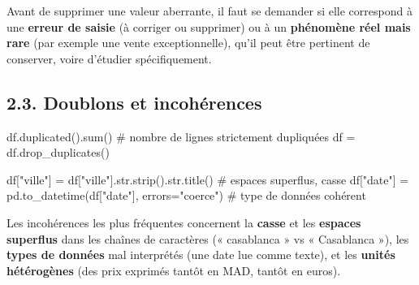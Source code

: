 \documentclass[
  french,
  letterpaper,
  open=any]{scrbook}
\newenvironment{Shaded}{\begin{snugshade}}{\end{snugshade}}
\newcommand{\BuiltInTok}[1]{\textcolor[rgb]{0.00,0.23,0.31}{#1}}
\newcommand{\CommentTok}[1]{\textcolor[rgb]{0.37,0.37,0.37}{#1}}
\newcommand{\NormalTok}[1]{\textcolor[rgb]{0.00,0.23,0.31}{#1}}
\newcommand{\OperatorTok}[1]{\textcolor[rgb]{0.37,0.37,0.37}{#1}}
\newcommand{\StringTok}[1]{\textcolor[rgb]{0.13,0.47,0.30}{#1}}
\theoremstyle{definition}
\theoremstyle{definition}
\theoremstyle{remark}
\begin{document}
\begin{tcolorbox}[enhanced jigsaw, arc=.35mm, bottomrule=.15mm, bottomtitle=1mm, breakable, colback=white, colbacktitle=quarto-callout-warning-color!10!white, colframe=quarto-callout-warning-color-frame, coltitle=black, left=2mm, leftrule=.75mm, opacityback=0, opacitybacktitle=0.6, rightrule=.15mm, title=\textcolor{quarto-callout-warning-color}{\faExclamationTriangle}\hspace{0.5em}{Une valeur aberrante n'est pas toujours une erreur}, titlerule=0mm, toprule=.15mm, toptitle=1mm]

Avant de supprimer une valeur aberrante, il faut se demander si elle
correspond à une \textbf{erreur de saisie} (à corriger ou supprimer) ou
à un \textbf{phénomène réel mais rare} (par exemple une vente
exceptionnelle), qu'il peut être pertinent de conserver, voire d'étudier
spécifiquement.

\end{tcolorbox}

\subsection{2.3. Doublons et
incohérences}\label{doublons-et-incohuxe9rences}

\begin{Shaded}
\begin{Highlighting}[]
\NormalTok{df.duplicated().}\BuiltInTok{sum}\NormalTok{()                     }\CommentTok{\# nombre de lignes strictement dupliquées}
\NormalTok{df }\OperatorTok{=}\NormalTok{ df.drop\_duplicates()}

\NormalTok{df[}\StringTok{"ville"}\NormalTok{] }\OperatorTok{=}\NormalTok{ df[}\StringTok{"ville"}\NormalTok{].}\BuiltInTok{str}\NormalTok{.strip().}\BuiltInTok{str}\NormalTok{.title()   }\CommentTok{\# espaces superflus, casse}
\NormalTok{df[}\StringTok{"date"}\NormalTok{] }\OperatorTok{=}\NormalTok{ pd.to\_datetime(df[}\StringTok{"date"}\NormalTok{], errors}\OperatorTok{=}\StringTok{"coerce"}\NormalTok{)  }\CommentTok{\# type de données cohérent}
\end{Highlighting}
\end{Shaded}

Les incohérences les plus fréquentes concernent la \textbf{casse} et les
\textbf{espaces superflus} dans les chaînes de caractères (« casablanca
» vs « Casablanca »), les \textbf{types de données} mal interprétés (une
date lue comme texte), et les \textbf{unités hétérogènes} (des prix
exprimés tantôt en MAD, tantôt en euros).
\end{document}
